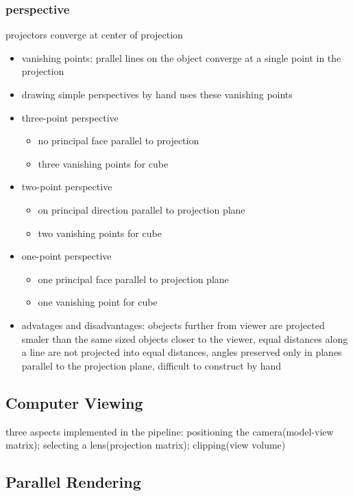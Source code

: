 \documentclass[11pt,a4paper]{article}
\begin{document}
	\subsubsection{perspective}
	projectors converge at center of projection
	\begin{itemize}
		\item vanishing points: prallel lines on the object converge at a single point in the projection
		\item drawing simple perspectives by hand uses these vanishing points
		\item three-point perspective
		\begin{itemize}
			\item no principal face parallel to projection
			\item three vanishing points for cube
		\end{itemize}
		\item two-point perspective
		\begin{itemize}
			\item on principal direction parallel to projection plane
			\item two vanishing points for cube
		\end{itemize}
		\item one-point perspective
		\begin{itemize}
			\item one principal face parallel to projection plane
			\item one vanishing point for cube
		\end{itemize}
		\item advatages and disadvantages: obejects further from viewer are projected smaler than the same sized objects closer to the viewer, equal distances along a line are not 				projected into equal distances, angles preserved only in planes parallel to the projection plane, difficult to construct by hand
	\end{itemize}

	\subsection{Computer Viewing}
	three aspects implemented in the pipeline: positioning the camera(model-view matrix); selecting a lens(projection matrix); clipping(view volume)
	\subsection{Parallel Rendering}
\end{document}
